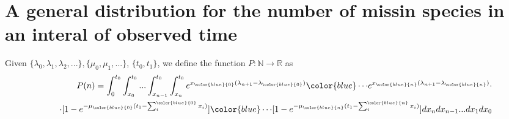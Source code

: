 \documentclass[10pt,a4paper]{beamer}
\begin{document}
\section*{A general distribution for the number of missin species in an interal of observed time}


\begin{frame}


\vspace{2cm}
Given $\{\lambda_0,\lambda_1,\lambda_2,...\}, \{\mu_0,\mu_1,...\}$, $\{t_0,t_1\}$, we define the function $P: \mathbb{N} \longrightarrow \mathbb{R}$ as
\begin{equation}
\begin{split}
P(n)=  \displaystyle\int_{0}^{t_0}\displaystyle\int_{x_0}^{t_0}...\displaystyle\int_{x_{n-1}}^{t_0}\displaystyle\int_{x_n}^{t_0} e^{x_{\color{blue}{0}}(\lambda_{n+1}-\lambda_{\color{blue}{0}})}{\color{blue} \cdots} e^{x_{\color{blue}{n}}(\lambda_{n+1}-\lambda_{\color{blue}{n}})}\cdot\\
\qquad \cdot[1-e^{-\mu_{\color{blue}{0}}(t_1-\sum_i^{{\color{blue}{0}}} x_i)}]{\color{blue} \cdots} [1-e^{-\mu_{\color{blue}{n}}(t_1-\sum_{i}^{{\color{blue}{n}}} x_i)}] dx_n dx_{n-1}...dx_1dx_0
\end{split}
\end{equation}
\end{frame}


\end{document}
